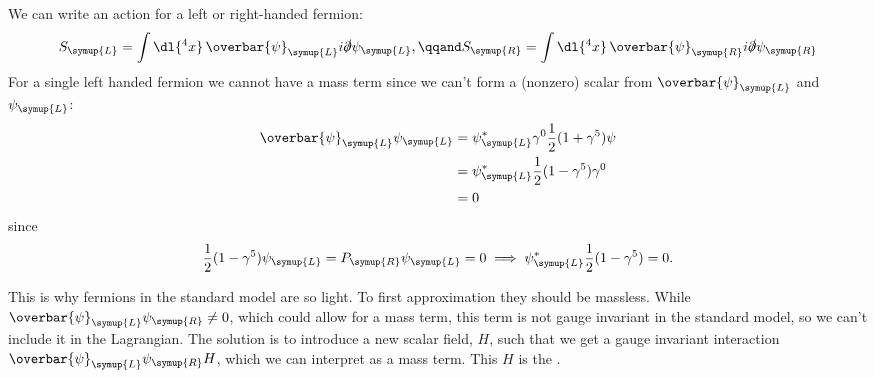 \documentclass[fleqn]{NotesClass}
\newcommand{\Left}{\symup{L}}
\newcommand{\Right}{\symup{R}}
\newcommand{\diracadjoint}[1]{\overbar{#1}}
\begin{document}
    We can write an action for a left or right-handed fermion:
    \begin{equation}
        S_{\Left} = \int \dl{^4x} \, \diracadjoint{\psi}_{\Left} i\slashed{\partial} \psi_{\Left}, \qqand S_{\Right} = \int \dl{^4x} \, \diracadjoint{\psi}_{\Right} i\slashed{\partial} \psi_{\Right}
    \end{equation}
    For a single left handed fermion we cannot have a mass term since we can't form a (nonzero) scalar from \(\diracadjoint{\psi}_{\Left}\) and \(\psi_{\Left}\):
    \begin{align}
        \diracadjoint{\psi}_{\Left}\psi_{\Left} &= \psi_{\Left}^* \gamma^0 \frac{1}{2}(1 + \gamma^5) \psi\\
        &= \psi_{\Left}^*\frac{1}{2}(1 - \gamma^5)\gamma^0\\
        &= 0
    \end{align}
    since
    \begin{equation}
        \frac{1}{2}(1 - \gamma^5)\psi_{\Left} = P_{\Right}\psi_{\Left} = 0 \implies \psi_{\Left}^* \frac{1}{2}(1 - \gamma^5) = 0.
    \end{equation}
    
    This is why fermions in the standard model are so light.
    To first approximation they should be massless.
    While \(\diracadjoint{\psi}_{\Left}\psi_{\Right} \ne 0\), which could allow for a mass term, this term is not gauge invariant in the standard model, so we can't include it in the Lagrangian.
    The solution is to introduce a new scalar field, \(H\), such that we get a gauge invariant interaction \(\diracadjoint{\psi}_{\Left} \psi_{\Right} H\), which we can interpret as a mass term.
    This \(H\) is the .
    
\end{document}
